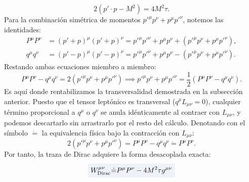 \documentclass[10pt,a4paper]{article}
\newcommand{\dest}[1]{{\setlength{\fboxsep}{4pt}\colorbox{colordest}{$\displaystyle #1$}}}
\begin{document}
\begin{enumerate}
\begin{equation}
    2 (p' \cdot p - M^2) = 4 M^2 \tau.
    \end{equation}
    Para la combinación simétrica de momentos $p'^\mu p^\nu + p^\mu p'^\nu$, notemos las identidades:
    \begin{align}
    P^\mu P^\nu &= (p' + p)^\mu (p' + p)^\nu = p'^\mu p'^\nu + p^\mu p^\nu + (p'^\mu p^\nu + p^\mu p'^\nu), \\
    q^\mu q^\nu &= (p' - p)^\mu (p' - p)^\nu = p'^\mu p'^\nu + p^\mu p^\nu - (p'^\mu p^\nu + p^\mu p'^\nu).
    \end{align}
    Restando ambas ecuaciones miembro a miembro:
    \begin{equation}
    P^\mu P^\nu - q^\mu q^\nu = 2 (p'^\mu p^\nu + p^\mu p'^\nu) \implies p'^\mu p^\nu + p^\mu p'^\nu = \frac{1}{2} (P^\mu P^\nu - q^\mu q^\nu).
    \end{equation}
    Es aquí donde rentabilizamos la transversalidad demostrada en la subsección anterior. Puesto que el tensor leptónico es transversal ($q^\mu L_{\mu\nu} = 0$), cualquier término proporcional a $q^\mu$ o $q^\nu$ se anula idénticamente al contraer con $L_{\mu\nu}$, y podemos descartarlo sin arrastrarlo por el resto del cálculo. Denotando con el símbolo $\dot{=}$ la equivalencia física bajo la contracción con $L_{\mu\nu}$:
    \begin{equation}
    2 (p'^\mu p^\nu + p^\mu p'^\nu) = P^\mu P^\nu - q^\mu q^\nu \dot{=} P^\mu P^\nu.
    \end{equation}
    Por tanto, la traza de Dirac adquiere la forma desacoplada exacta:
    \begin{equation}
    \dest{W_{\text{Dirac}}^{\mu\nu} \dot{=} P^\mu P^\nu - 4 M^2 \tau g^{\mu\nu}}
    \label{eq:W_dirac_eval}
    \end{equation}


\end{enumerate}
\end{document}
